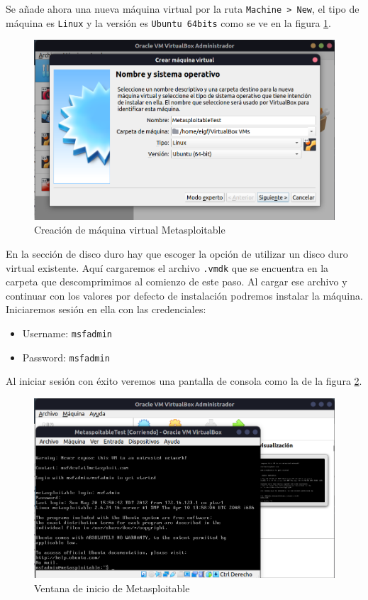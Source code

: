 \documentclass{article}
\begin{document}
            Se añade ahora una nueva máquina virtual por la ruta \texttt{Machine > New}, el tipo de máquina es \texttt{Linux} y la versión es \texttt{Ubuntu 64bits} como se ve en la figura \ref{fig:meta-create}.
            \begin{figure}
                \centering
                \includegraphics[scale=0.25]{img/meta-create.png}
                \caption{Creación de máquina virtual Metasploitable}
                \label{fig:meta-create}
            \end{figure}

            En la sección de disco duro hay que escoger la opción de utilizar un disco duro virtual existente. Aquí cargaremos el archivo \texttt{.vmdk} que se encuentra en la carpeta que descomprimimos al comienzo de este paso. Al cargar ese archivo y continuar con los valores por defecto de instalación podremos instalar la máquina. Iniciaremos sesión en ella con las credenciales:
            \begin{itemize}
                \item Username: \texttt{msfadmin}
                \item Password: \texttt{msfadmin}
            \end{itemize}

            Al iniciar sesión con éxito veremos una pantalla de consola como la de la figura \ref{fig:meta-init}.
            \begin{figure}[!htbp]
                \centering
                \includegraphics[scale=0.3]{img/meta-init.png}
                \caption{Ventana de inicio de Metasploitable}
                \label{fig:meta-init}
            \end{figure}
\end{document}
